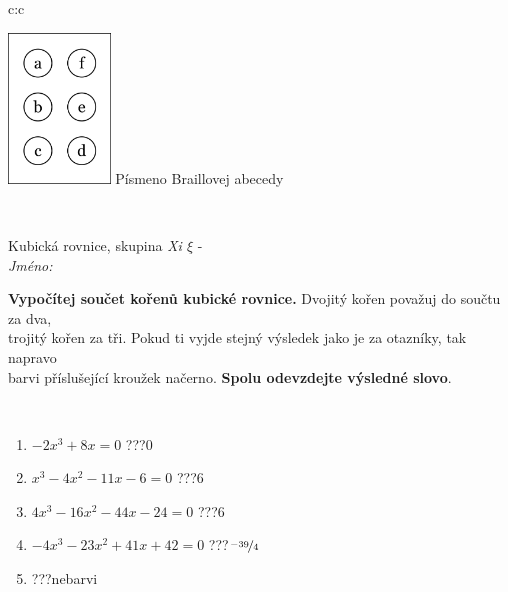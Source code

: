 \documentclass[10pt]{report}
\begin{document}
\begin{tabular}{c:c}
\begin{minipage}[c][104.5mm][t]{0.5\linewidth}
\begin{center}
\begin{minipage}{0.20\linewidth}
\begin{center}
\includegraphics[height=40mm]{../images/braille.png}
{\small Písmeno Braillovej abecedy}
\end{center}
\end{minipage}
\end{center}
\end{minipage}
\\ \hdashline
\begin{minipage}[c][104.5mm][t]{0.5\linewidth}
\begin{center}
\vspace{7mm}
{\huge Kubická rovnice, skupina \textit{Xi $\xi$} -}\\[5mm]
\textit{Jméno:}\phantom{xxxxxxxxxxxxxxxxxxxxxxxxxxxxxxxxxxxxxxxxxxxxxxxxxxxxxxxxxxxxxxxxx}\\[5mm]
\begin{minipage}{0.95\linewidth}
\begin{center}
\textbf{Vypočítej součet kořenů kubické rovnice.} Dvojitý kořen považuj do součtu za dva,\\trojitý kořen za tři. Pokud ti vyjde stejný výsledek jako je za otazníky, tak napravo\\barvi příslušející kroužek načerno. \textbf{Spolu odevzdejte výsledné slovo}.
\end{center}
\end{minipage}
\\[1mm]
\begin{minipage}{0.79\linewidth}
\begin{center}
\begin{varwidth}{\linewidth}
\begin{enumerate}
\Large
\item $-2x^3+8x=0$\quad \dotfill\; ???\;\dotfill \quad $0$
\item $x^3-4x^2-11x-6=0$\quad \dotfill\; ???\;\dotfill \quad $6$
\item $4x^3-16x^2-44x-24=0$\quad \dotfill\; ???\;\dotfill \quad $6$
\item $-4x^3-23x^2+41x+42=0$\quad \dotfill\; ???\;\dotfill \quad $\nicefrac{-39}{4}$
\item \quad \dotfill\; ???\;\dotfill \quad nebarvi

\end{enumerate}
\end{varwidth}
\end{center}
\end{minipage}
\end{center}
\end{minipage}
\end{tabular}
\end{document}
